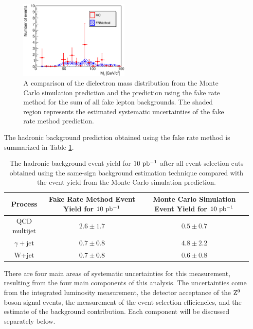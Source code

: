 \documentclass{cmspaper}
\begin{document}
\begin{figure}[htb]
  \begin{center}
    \includegraphics[width=0.49\textwidth]{plots/zeeDileptonMass_FakeRatePrediction_Total.eps}     
    \caption{A comparison of the dielectron mass distribution from the Monte Carlo simulation prediction and the prediction using the fake rate method for the sum of all fake lepton backgrounds. The shaded region represents the estimated systematic uncertainties of the fake rate method prediction. }
    \label{fig:zeeDileptonMass_FakeRatePrediction_Total}
  \end{center}
\end{figure}


The hadronic background prediction obtained using the fake rate method is summarized in Table \ref{tab:zeeHadBckFakeRateMethod}.

\begin{table}[!ht]
\begin{center}
\begin{tabular}{|c|c|c|}
\hline
 Process & Fake Rate Method Event Yield for $10\ \mathrm{pb^{-1}}$ & Monte Carlo Simulation Event Yield for $10\ \mathrm{pb^{-1}}$\\
\hline
\hline
 QCD multijet               & $2.6 \pm 1.7$ & $0.5 \pm 0.7$  \\
 $\gamma+$jet               & $0.7 \pm 0.8$ & $4.8 \pm 2.2$  \\
 W+jet                      & $0.7 \pm 0.8$ & $0.6 \pm 0.8$  \\

\hline
\end{tabular}
\caption{The hadronic background event yield for $10\ \mathrm{pb^{-1}}$ after all \Z\To\Ep\Em event selection cuts obtained using the same-sign background estimation technique compared with the event yield from the Monte Carlo simulation prediction.\label{tab:zeeHadBckFakeRateMethod}}
\end{center}
\end{table}


\label{sec:systematics}
There are four main areas of systematic uncertainties for this measurement, resulting from the four main components of this analysis. The uncertainties come from the integrated luminosity measurement, the detector acceptance of the $\mathrm{Z^0}$ boson signal events, the measurement of the event selection efficiencies, and the estimate of the background contribution. Each component will be discussed separately below.
\end{document}
